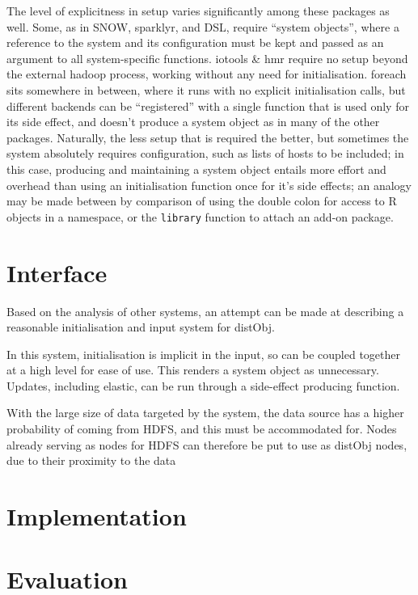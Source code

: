 \documentclass[a4paper,10pt]{article}
\begin{document}
The level of explicitness in setup varies significantly among these packages as
well.
Some, as in SNOW, sparklyr, and DSL, require ``system objects'', where a
reference to the system and its configuration must be kept and passed as an
argument to all system-specific functions.
iotools \& hmr require no setup beyond the external hadoop process, working
without any need for initialisation.
foreach sits somewhere in between, where it runs with no explicit
initialisation calls, but different backends can be ``registered'' with a
single function that is used only for its side effect, and doesn't produce a
system object as in many of the other packages.
Naturally, the less setup that is required the better, but sometimes the system
absolutely requires configuration, such as lists of hosts to be included; in
this case, producing and maintaining a system object entails more effort and
overhead than using an initialisation function once for it's side effects; an
analogy may be made between by comparison of using the double colon for access
to R objects in a namespace, or the \texttt{library} function to attach
an add-on package.

\section{Interface}

Based on the analysis of other systems, an attempt can be made at describing a
reasonable initialisation and input system for distObj.

In this system, initialisation is implicit in the input, so can be coupled
together at a high level for ease of use.
This renders a system object as unnecessary.
Updates, including elastic, can be run through a side-effect producing
function.

With the large size of data targeted by the system, the data source has a
higher probability of coming from HDFS, and this must be accommodated for.
Nodes already serving as nodes for HDFS can therefore be put to use as distObj
nodes, due to their proximity to the data

\section{Implementation}

\section{Evaluation}

\printbibliography
\end{document}
